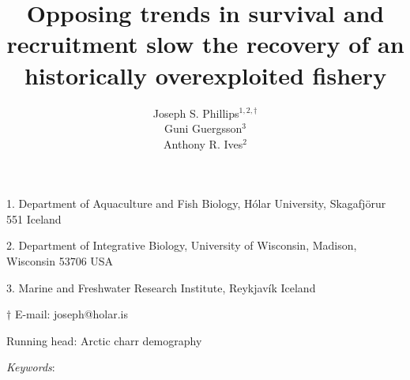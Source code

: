 \documentclass[11pt]{article}
\title{Opposing trends in survival and recruitment slow the recovery 
        of an historically overexploited fishery}
\author{
Joseph S. Phillips$^{1,2, \dagger}$ \\
Gu{\dh}ni Gu{\dh}ergsson$^{3}$ \\
Anthony R. Ives$^{2}$
}
\date{}
\begin{document}
\raggedright
\setlength\parindent{0.25in}

\maketitle


\noindent{} 1. Department of Aquaculture and Fish Biology, 
H\'{o}lar University, Skagafj\"{o}r{\dh}ur 551 Iceland

\noindent{} 2. Department of Integrative Biology, 
University of Wisconsin, Madison, Wisconsin 53706 USA

\noindent{} 3. Marine and Freshwater Research Institute, Reykjav\'{i}k Iceland

\noindent{} $\dagger$ E-mail: joseph@holar.is



\bigskip

Running head: {Arctic charr demography}

\linenumbers{}

\clearpage








\bigskip

\textit{Keywords}: {}

\clearpage
















\end{document}
